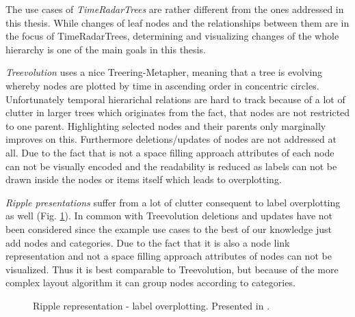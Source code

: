 The use cases of \emph{TimeRadarTrees} are rather different from the ones addressed in this thesis. While changes of leaf nodes and the relationships between them are in the focus of TimeRadarTrees, determining and visualizing changes of the whole hierarchy is one of the main goals in this thesis.

\emph{Treevolution} uses a nice Treering-Metapher, meaning that a tree is evolving whereby nodes are plotted by time in ascending order in concentric circles. Unfortunately temporal hierarichal relations are hard to track because of a lot of clutter in larger trees which originates from the fact, that nodes are not restricted to one parent. Highlighting selected nodes and their parents only marginally improves on this. Furthermore deletions/updates of nodes are not addressed at all. Due to the fact that is not a space filling approach attributes of each node can not be visually encoded and the readability is reduced as labels can not be drawn inside the nodes or items itself which leads to overplotting. 

\emph{Ripple presentations} suffer from a lot of clutter consequent to label overplotting as well (Fig. \ref{fig:ripple-clutter}). In common with Treevolution deletions and updates have not been considered since the example use cases to the best of our knowledge just add nodes and categories. Due to the fact that it is also a node link representation and not a space filling approach attributes of nodes can not be visualized. Thus it is best comparable to Treevolution, but because of the more complex layout algorithm it can group nodes according to categories. 

\begin{figure}[tb]
\caption{\label{fig:ripple-clutter} Ripple representation - label overplotting. Presented in \cite{ishihara2006ripple}.}
\end{figure}

